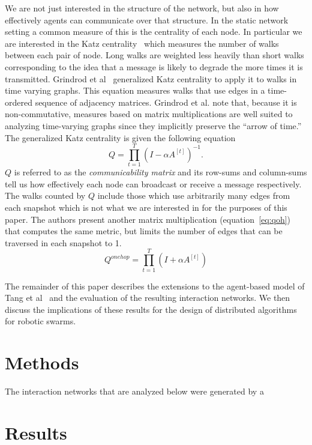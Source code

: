 \documentclass[conference]{IEEEtran}
\newcommand{\adj}[1]{A^{[#1]}}
\begin{document}
We are not just interested in the structure of the network, but also
in how effectively agents can communicate over that structure. In the
static network setting a common measure of this is the centrality of
each node. In particular we are interested in the Katz
centrality~\cite{Newman2010} which measures the number of walks
between each pair of node. Long walks are weighted less heavily than
short walks corresponding to the idea that a message is likely to
degrade the more times it is transmitted. Grindrod et
al~\cite{Grindrod2011} generalized Katz centrality to apply it to
walks in time varying graphs. This equation measures walks that use
edges in a time-ordered sequence of adjacency matrices. Grindrod et
al. note that, because it is non-commutative, measures based on matrix
multiplications are well suited to analyzing time-varying graphs since
they implicitly preserve the ``arrow of time.'' The generalized Katz
centrality is given the following equation
\begin{equation}
  Q = \prod_{t = 1}^T(I - \alpha \adj{t})^{-1}.
  \label{eq:q}
\end{equation}
$Q$ is referred to as the \emph{communicability matrix} and its
row-sums and column-sums tell us how effectively each node can
broadcast or receive a message respectively. The walks counted by $Q$
include those which use arbitrarily many edges from each snapshot
which is not what we are interested in for the purposes of this
paper. The authors present another matrix multiplication
(equation~\ref{eq:qoh}) that computes the same metric, but limits the
number of edges that can be traversed in each snapshot to 1.
\begin{equation}
  Q^{onehop} = \prod_{t = 1}^T(I + \alpha \adj{t})
  \label{eq:qoh}
\end{equation}

The remainder of this paper describes the extensions to the
agent-based model of Tang et al~\cite{Tang2010} and the evaluation of
the resulting interaction networks. We then discuss the implications
of these results for the design of distributed algorithms for robotic
swarms.

\section{Methods}
\label{sec:methods}

The interaction networks that are analyzed below were generated by a

\section{Results}
\end{document}
